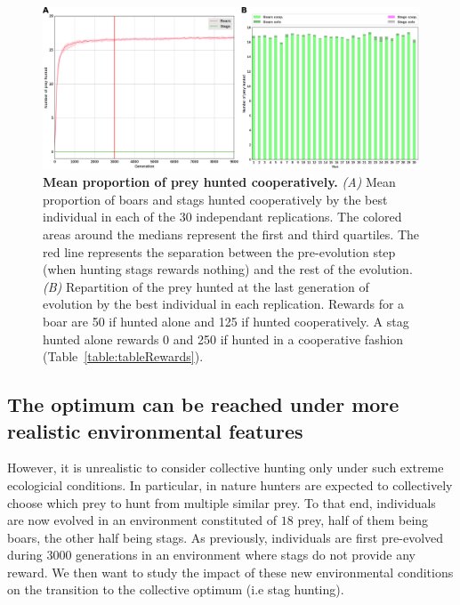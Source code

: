 
    \begin{figure}[h]
      \centering
        \includegraphics[width=1\linewidth]{fig/ArticleBio2/Fig1.png}
        \caption{\textbf{Mean proportion of prey hunted cooperatively.}
        \emph{(A)} Mean proportion of boars and stags hunted cooperatively by the best individual in each of the $30$ independant replications. The colored areas around the medians represent the first and third quartiles. The red line represents the separation between the pre-evolution step (when hunting stags rewards nothing) and the rest of the evolution. \emph{(B)} Repartition of the prey hunted at the last generation of evolution by the best individual in each replication. Rewards for a boar are 50 if hunted alone and 125 if hunted cooperatively. A stag hunted alone rewards 0 and 250 if hunted in a cooperative fashion (Table~\ref{table:tableRewards}).}
      \label{fig:figControl}
    \end{figure}

  \subsection{The optimum can be reached under more realistic environmental features}
    However, it is unrealistic to consider collective hunting only under such extreme ecologicial conditions. In particular, in nature hunters are expected to collectively choose which prey to hunt from multiple similar prey. To that end, individuals are now evolved in an environment constituted of $18$ prey, half of them being boars, the other half being stags. As previously, individuals are first pre-evolved during $3000$ generations in an environment where stags do not provide any reward. We then want to study the impact of these new environmental conditions on the transition to the collective optimum (i.e stag hunting).

